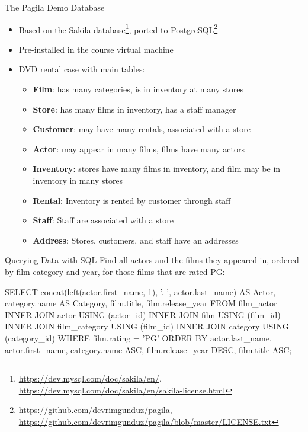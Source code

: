 \documentclass[ignorenonframetext,xcolor=x11names]{beamer}
\begin{document}
\begin{frame}[label=withcode]{The Pagila Demo Database}

\begin{itemize}
  \item Based on the Sakila database\footnote{\scriptsize\url{https://dev.mysql.com/doc/sakila/en/}, 
\url{https://dev.mysql.com/doc/sakila/en/sakila-license.html}}, ported to PostgreSQL\footnote{\scriptsize\url{https://github.com/devrimgunduz/pagila},
\url{https://github.com/devrimgunduz/pagila/blob/master/LICENSE.txt}}
  \item Pre-installed in the course virtual machine
  \item DVD rental case with main tables:
  \begin{itemize}
	\item \textbf{Film}: has many categories, is in inventory at many stores
	\item \textbf{Store}: has many films in inventory, has a staff manager
	\item \textbf{Customer}: may have many rentals, associated with a store
	\item \textbf{Actor}: may appear in many films, films have many actors
	\item \textbf{Inventory}: stores have many films in inventory, and film may be in inventory in many stores
	\item \textbf{Rental}: Inventory is rented by customer through staff
	\item \textbf{Staff}: Staff are associated with a store
	\item \textbf{Address}: Stores, customers, and staff have an addresses
  \end{itemize}
\end{itemize}
\end{frame}

\begin{frame}[label=withcode,fragile]{Querying Data with SQL}
Find all actors and the films they appeared in, ordered by film category and year, for those films that are rated PG:
\footnotesize
\begin{sqlcode}
SELECT concat(left(actor.first_name, 1), 
              '. ', actor.last_name) AS Actor, 
       category.name AS Category, 
       film.title, 
       film.release_year
  FROM film_actor
  INNER JOIN actor USING (actor_id)
  INNER JOIN film USING (film_id)
  INNER JOIN film_category USING (film_id)
  INNER JOIN category USING (category_id)
  WHERE film.rating = 'PG'
  ORDER BY actor.last_name, 
           actor.first_name, 
           category.name ASC, 
           film.release_year DESC, 
           film.title ASC;
\end{sqlcode}
\end{frame}
\end{document}
